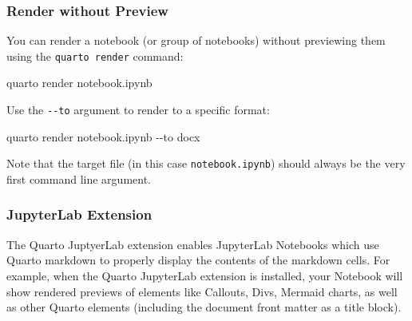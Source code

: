 \documentclass[
  letterpaper,
  DIV=11,
  numbers=noendperiod,
  oneside]{scrreprt}
\newenvironment{Shaded}{\begin{snugshade}}{\end{snugshade}}
\newcommand{\AttributeTok}[1]{\textcolor[rgb]{0.40,0.45,0.13}{#1}}
\newcommand{\ExtensionTok}[1]{\textcolor[rgb]{0.00,0.23,0.31}{#1}}
\newcommand{\NormalTok}[1]{\textcolor[rgb]{0.00,0.23,0.31}{#1}}
\begin{document}
\begin{tcolorbox}
\subsubsection{Render without Preview}\label{render-without-preview}

You can render a notebook (or group of notebooks) without previewing
them using the \texttt{quarto\ render} command:

\begin{codelisting}[H]

\caption{\texttt{Terminal}}

\begin{Shaded}
\begin{Highlighting}[]
\ExtensionTok{quarto}\NormalTok{ render notebook.ipynb}
\end{Highlighting}
\end{Shaded}

\end{codelisting}

Use the \texttt{-\/-to} argument to render to a specific format:

\begin{codelisting}[H]

\caption{\texttt{Terminal}}

\begin{Shaded}
\begin{Highlighting}[]
\ExtensionTok{quarto}\NormalTok{ render notebook.ipynb }\AttributeTok{{-}{-}to}\NormalTok{ docx}
\end{Highlighting}
\end{Shaded}

\end{codelisting}

Note that the target file (in this case \texttt{notebook.ipynb}) should
always be the very first command line argument.

\subsubsection{JupyterLab Extension}\label{jupyterlab-extension}

The Quarto JuptyerLab extension enables JupyterLab Notebooks which use
Quarto markdown to properly display the contents of the markdown cells.
For example, when the Quarto JupyterLab extension is installed, your
Notebook will show rendered previews of elements like Callouts, Divs,
Mermaid charts, as well as other Quarto elements (including the document
front matter as a title block).


\end{tcolorbox}
\end{document}

